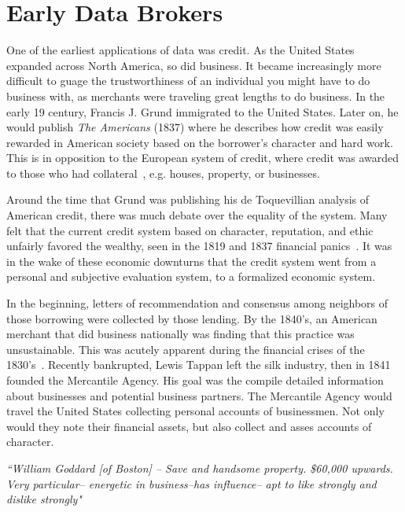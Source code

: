 \section{Early Data Brokers}

One of the earliest applications of data was credit. As the United States
expanded across North America, so did business. It became increasingly more
difficult to guage the trustworthiness of an individual you might have to do
business with, as merchants were traveling great lengths to do business. In the
early 19 century, Francis J. Grund immigrated to the United States.
Later on, he would publish \textit{The Americans} (1837) where he describes how
credit was easily rewarded in American society based on the borrower's
character and hard work. This is in opposition to the European system of
credit, where credit was awarded to those who had
collateral~\cite{lauer2017creditworthy}, e.g. houses, property, or businesses.

Around the time that Grund was publishing his de Toquevillian analysis of
American credit, there was much debate over the equality of the system.
Many felt that the current credit system based on character, reputation, and
ethic unfairly favored the wealthy, seen in the 1819 and 1837 financial
panics~\cite{lauer2017creditworthy}. It was in the wake of these economic
downturns that the credit system went from a personal and subjective evaluation
system, to a formalized economic system.

In the beginning, letters of recommendation and consensus among neighbors of
those borrowing were collected by those lending. By the 1840's, an American
merchant that did business nationally was finding that this practice was
unsustainable. This was acutely apparent during the financial crises of the
1830's~\cite{lauer2017creditworthy}. Recently bankrupted, Lewis Tappan left the
silk industry, then in 1841 founded the Mercantile Agency. His goal was the
compile detailed information about businesses and potential business partners.
The Mercantile Agency would travel the United States collecting personal accounts
of businessmen. Not only would they note their financial assets, but also
collect and asses accounts of character.

\begin{center} \textit{
		``William Goddard [of Boston] -- Save and handsome property. \$60,000 upwards.
		Very particular-- energetic in business--has influence-- apt to like strongly
		and dislike strongly"}
\end{center}

